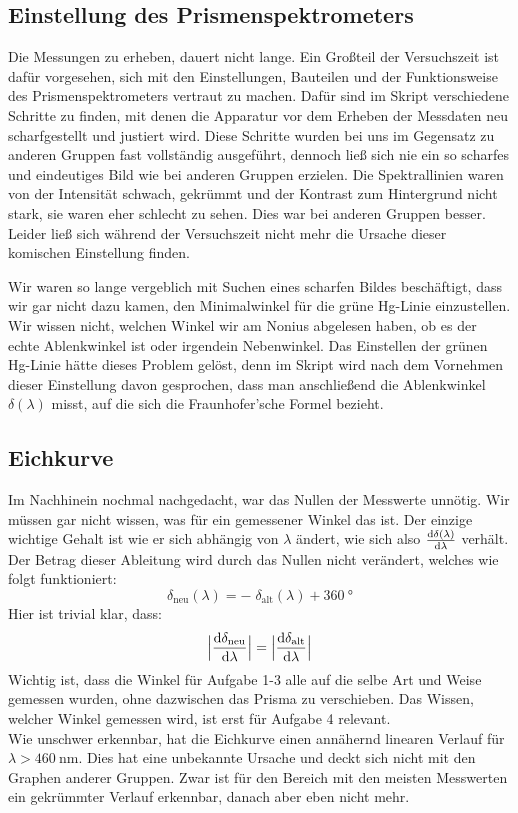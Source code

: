 \subsection{Einstellung des Prismenspektrometers}
Die Messungen zu erheben, dauert nicht lange. Ein Großteil der Versuchszeit ist dafür vorgesehen, sich mit den Einstellungen, Bauteilen und der Funktionsweise des Prismenspektrometers vertraut zu machen. Dafür sind im Skript verschiedene Schritte zu finden, mit denen die Apparatur vor dem Erheben der Messdaten neu scharfgestellt und justiert wird. Diese Schritte wurden bei uns im Gegensatz zu anderen Gruppen fast vollständig ausgeführt, dennoch ließ sich nie ein so scharfes und eindeutiges Bild wie bei anderen Gruppen erzielen. Die Spektrallinien waren von der Intensität schwach, gekrümmt und der Kontrast zum Hintergrund nicht stark, sie waren eher schlecht zu sehen. Dies war bei anderen Gruppen besser. Leider ließ sich während der Versuchszeit nicht mehr die Ursache dieser komischen Einstellung finden.

Wir waren so lange vergeblich mit Suchen eines scharfen Bildes beschäftigt, dass wir gar nicht dazu kamen, den Minimalwinkel für die grüne Hg-Linie einzustellen. Wir wissen nicht, welchen Winkel wir am Nonius abgelesen haben, ob es der echte Ablenkwinkel ist oder irgendein Nebenwinkel. Das Einstellen der grünen Hg-Linie hätte dieses Problem gelöst, denn im Skript wird nach dem Vornehmen dieser Einstellung davon gesprochen, dass man anschließend die Ablenkwinkel \(\delta(\lambda)\) misst, auf die sich die Fraunhofer'sche Formel bezieht.

\subsection{Eichkurve}
Im Nachhinein nochmal nachgedacht, war das Nullen der Messwerte unnötig. Wir müssen gar nicht wissen, was für ein gemessener Winkel das ist. Der einzige wichtige Gehalt ist wie er sich abhängig von \(\lambda\) ändert, wie sich also \(\frac{\mathop{}\!\mathrm{d} \delta(\lambda)}{\mathop{}\!\mathrm{d} \lambda}\) verhält. Der Betrag dieser Ableitung wird durch das Nullen nicht verändert, welches wie folgt funktioniert:
\begin{equation}
    \delta_{\text{neu}} (\lambda)=-\;\delta_{\text{alt}} (\lambda) + \qty{360}{\degree}
\end{equation}
Hier ist trivial klar, dass:
\begin{equation}
    \Big|\frac{\mathop{}\!\mathrm{d}\delta_{\text{neu}}}{\mathop{}\!\mathrm{d}\lambda}\Big|=\Big|\frac{\mathop{}\!\mathrm{d}\delta_{\text{alt}}}{\mathop{}\!\mathrm{d}\lambda}\Big|
\end{equation}
Wichtig ist, dass die Winkel für Aufgabe 1-3 alle auf die selbe Art und Weise gemessen wurden, ohne dazwischen das Prisma zu verschieben. Das Wissen, welcher Winkel gemessen wird, ist erst für Aufgabe 4 relevant.\\
Wie unschwer erkennbar, hat die Eichkurve einen annähernd linearen Verlauf für \(\lambda>\qty{460}{\nm}\). Dies hat eine unbekannte Ursache und deckt sich nicht mit den Graphen anderer Gruppen. Zwar ist für den Bereich mit den meisten Messwerten ein gekrümmter Verlauf erkennbar, danach aber eben nicht mehr.


